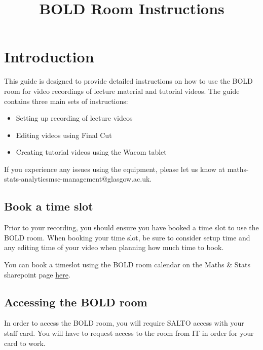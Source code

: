 \documentclass[
]{book}
\title{BOLD Room Instructions}
\author{}
\date{\vspace{-2.5em}}
\providecommand{\tightlist}{%
  \setlength{\itemsep}{0pt}\setlength{\parskip}{0pt}}
\begin{document}
\maketitle

{
\setcounter{tocdepth}{1}
\tableofcontents
}
\hypertarget{introduction}{%
\chapter{Introduction}\label{introduction}}

This guide is designed to provide detailed instructions on how to use the BOLD room for video recordings of lecture material and tutorial videos. The guide contains three main sets of instructions:

\begin{itemize}
\tightlist
\item
  Setting up recording of lecture videos
\item
  Editing videos using Final Cut
\item
  Creating tutorial videos using the Wacom tablet
\end{itemize}

If you experience any issues using the equipment, please let us know at maths-stats-analyticsmsc-management@glasgow.ac.uk.

\hypertarget{book-a-time-slot}{%
\section{Book a time slot}\label{book-a-time-slot}}

Prior to your recording, you should ensure you have booked a time slot to use the BOLD room. When booking your time slot, be sure to consider setup time and any editing time of your video when planning how much time to book.

You can book a timeslot using the BOLD room calendar on the Maths \& Stats sharepoint page \href{https://gla.sharepoint.com/sites/school-maths-stats/Lists/BOLD\%20Room/calendar.aspx}{here}.

\hypertarget{accessing-the-bold-room}{%
\section{Accessing the BOLD room}\label{accessing-the-bold-room}}

In order to access the BOLD room, you will require SALTO access with your staff card. You will have to request access to the room from IT in order for your card to work.
\end{document}
